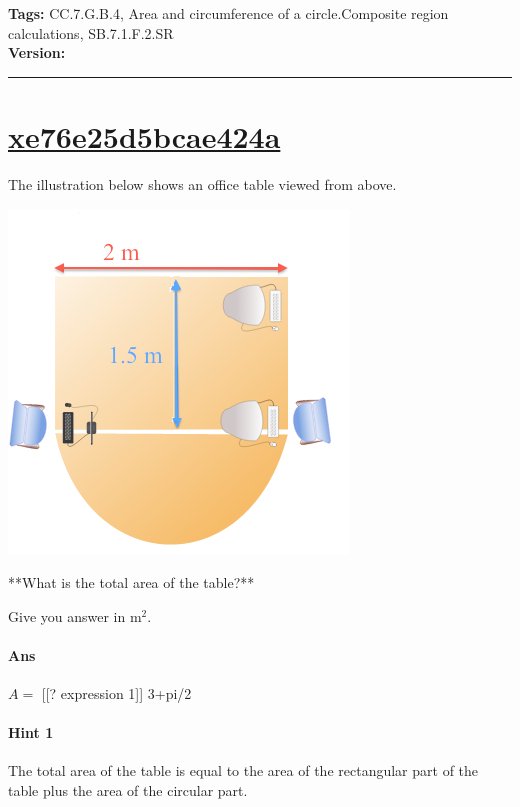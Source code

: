 \documentclass[twocolumn,10pt]{article}
\def\shrinkfactor{0.45}
\begin{document}
\medskip
\noindent
\textbf{Tags:} {\footnotesize CC.7.G.B.4, Area and circumference of a circle.Composite region calculations, SB.7.1.F.2.SR}\\
\textbf{Version:} \DIFdelbegin {}\DIFdelend \DIFaddbegin {}\DIFaddend \smallskip\hrule





\section{\href{https://www.khanacademy.org/devadmin/content/items/xe76e25d5bcae424a}{xe76e25d5bcae424a}}

\noindent
The illustration below shows an office table viewed from above.  

\includegraphics[scale=\shrinkfactor]{figures/2e7c87313a5fdbe0bacdee8a3f8f46418add2f40.png}

**What is the total area of the table?**  

Give you answer in $\text{m}^2$.

\paragraph{Ans} $A=$ 
[[? expression 1]]  3+pi/2

\paragraph{Hint 1}The total area of the table is equal to the area of the rectangular part of the table plus the area of the circular part.
\end{document}
